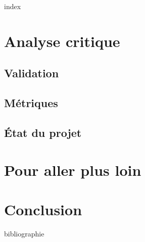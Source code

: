 {index}


\chapter{Analyse critique}
\section{Validation}
\section{Métriques}
\section{État du projet}

 
\chapter{Pour aller plus loin}

\chapter{Conclusion}

\backmatter

{bibliographie}

